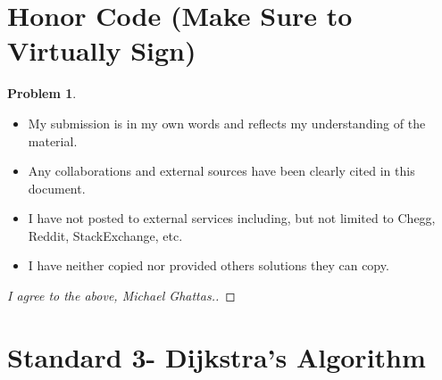 \documentclass[11pt]{article}
\theoremstyle{definition}
\theoremstyle{definition}
\newtheorem{required}{Problem}
\theoremstyle{definition}
\begin{document}
\section{Honor Code (Make Sure to Virtually Sign)} \label{HonorCode}

\begin{required}
\begin{itemize}
\item My submission is in my own words and reflects my understanding of the material.
\item Any collaborations and external sources have been clearly cited in this document.
\item I have not posted to external services including, but not limited to Chegg, Reddit, StackExchange, etc.
\item I have neither copied nor provided others solutions they can copy.
\end{itemize}

\end{required}

\begin{proof}[I agree to the above, Michael Ghattas.]
\end{proof}



\newpage
\section{Standard 3- Dijkstra's Algorithm}
\end{document}
